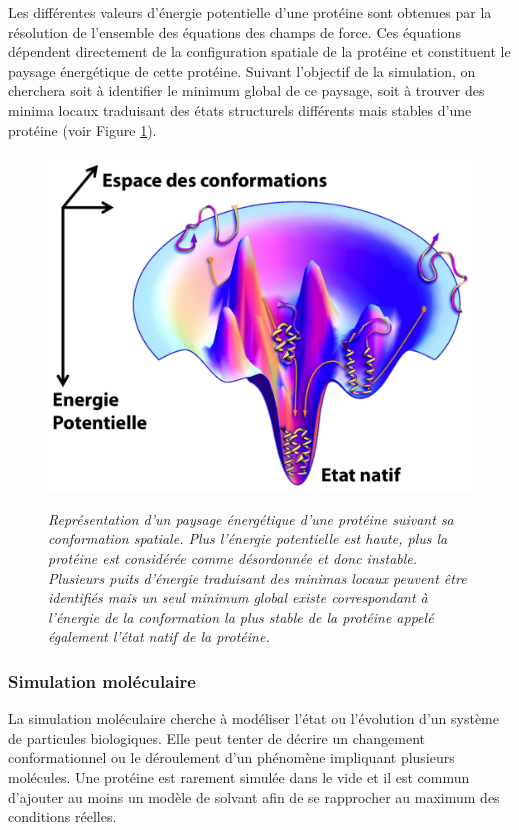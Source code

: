 
Les différentes valeurs d'énergie potentielle d'une protéine sont obtenues par la résolution de l'ensemble des équations des champs de force. Ces équations dépendent directement de la configuration spatiale de la protéine et constituent le paysage énergétique de cette protéine. Suivant l’objectif de la simulation, on cherchera soit à identifier le minimum global de ce paysage, soit à trouver des minima locaux traduisant des états structurels différents mais stables d'une protéine (voir Figure \ref{Fig:energy_landscape_edit}).


\begin{figure}
  \centering
  {\includegraphics[width=0.65\linewidth]{./figures/ch1/energy_landscape_edit.png}}
    \caption[Représentation d'un paysage énergétique d'une protéine suivant sa conformation spatiale.]{\it Représentation d'un paysage énergétique d'une protéine suivant sa conformation spatiale. Plus l'énergie potentielle est haute, plus la protéine est considérée comme désordonnée et donc instable. Plusieurs puits d'énergie traduisant des minimas locaux peuvent être identifiés mais un seul minimum global existe correspondant à l'énergie de la conformation la plus stable de la protéine appelé également l'état natif de la protéine.}
    \label{Fig:energy_landscape_edit}
  \hspace{0.2cm}
\end{figure}
 

\subsubsection{Simulation moléculaire} \label{simu}


La simulation moléculaire cherche à modéliser l'état ou l'évolution d'un système de particules biologiques. Elle peut tenter de décrire un changement conformationnel ou le déroulement d'un phénomène impliquant plusieurs molécules.
Une protéine est rarement simulée dans le vide et il est commun d'ajouter au moins un modèle de solvant afin de se rapprocher au maximum des conditions réelles.

